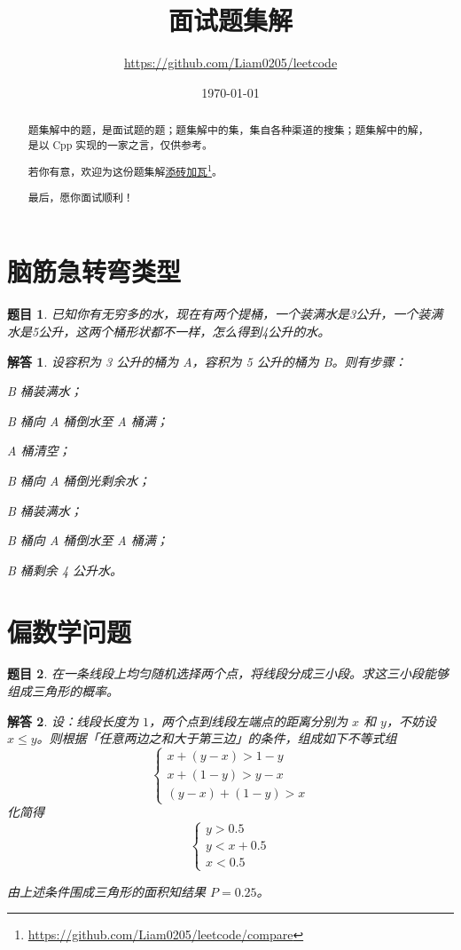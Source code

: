 \documentclass[UTF8, final]{ctexart}
\title{面试题集解}
\author{\url{https://github.com/Liam0205/leetcode}}
\date{\today}
\newtheorem{question}{题目}
\newtheorem{solution}{解答}
\begin{document}
\maketitle
\begin{abstract}
    题集解中的题，是面试题的题；题集解中的集，集自各种渠道的搜集；题集解中的解，是以 Cpp 实现的一家之言，仅供参考。

    若你有意，欢迎为这份题集解\href{https://github.com/Liam0205/leetcode/compare}{添砖加瓦}\footnote{\url{https://github.com/Liam0205/leetcode/compare}}。

    最后，愿你面试顺利！
\end{abstract}
\tableofcontents

\section{脑筋急转弯类型}
\begin{question}
已知你有无穷多的水，现在有两个提桶，一个装满水是3公升，一个装满水是5公升，这两个桶形状都不一样，怎么得到4公升的水。
\end{question}
\begin{solution}
设容积为 3 公升的桶为 A，容积为 5 公升的桶为 B。则有步骤：
\begin{compactitem}
    \item B 桶装满水；
    \item B 桶向 A 桶倒水至 A 桶满；
    \item A 桶清空；
    \item B 桶向 A 桶倒光剩余水；
    \item B 桶装满水；
    \item B 桶向 A 桶倒水至 A 桶满；
    \item B 桶剩余 4 公升水。
\end{compactitem}
\end{solution}

\section{偏数学问题}
\begin{question}
在一条线段上均匀随机选择两个点，将线段分成三小段。求这三小段能够组成三角形的概率。
\end{question}
\begin{solution}
设：线段长度为 $1$，两个点到线段左端点的距离分别为 $x$ 和 $y$，不妨设 $x \leqslant y$。则根据「任意两边之和大于第三边」的条件，组成如下不等式组
\[
  \begin{cases}
    x + (y - x) > 1 - y \\
    x + (1 - y) > y - x \\
    (y - x) + (1 - y) > x
  \end{cases}
\]
化简得
\[
  \begin{cases}
    y > 0.5 \\
    y < x + 0.5 \\
    x < 0.5
  \end{cases}
\]

由上述条件围成三角形的面积知结果 $P = 0.25$。

\end{solution}
\end{document}

